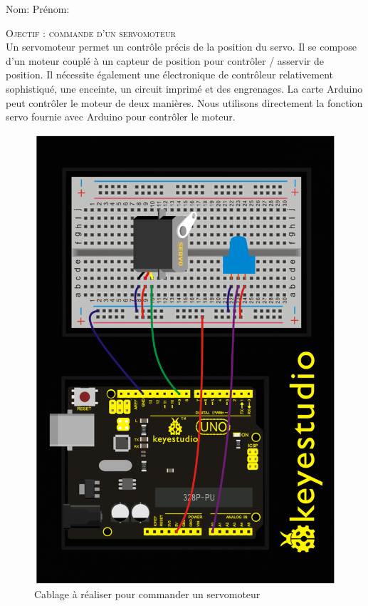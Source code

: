 \documentclass[a4paper, 11pt]{article}           %
\newcommand{\ligne}{\underline{\hspace{ \textwidth}} }
\begin{document}
\sffamily


\begin{center}
Nom:\underline{\hspace{4cm}} \hspace{4cm}Prénom:\underline{\hspace{4cm}}\\
\ligne
\end{center}

\bigskip

\textsc{\huge Ojectif : commande d'un servomoteur}\\
Un servomoteur permet un contrôle précis de la position du servo. Il se compose d'un moteur couplé à un capteur de position pour contrôler / asservir de position. Il nécessite également une électronique de contrôleur relativement sophistiqué, une enceinte, un circuit imprimé et des engrenages. La carte Arduino peut contrôler le moteur de deux manières. Nous utilisons directement la fonction servo fournie avec Arduino pour contrôler le moteur.
\begin{figure}[!h]
\begin{center}
\includegraphics[height=\textwidth,angle=270]{cablage}
\caption{Cablage à réaliser pour commander un servomoteur}
\label{FigCablage}
\end{center}
\end{figure}
\end{document}
